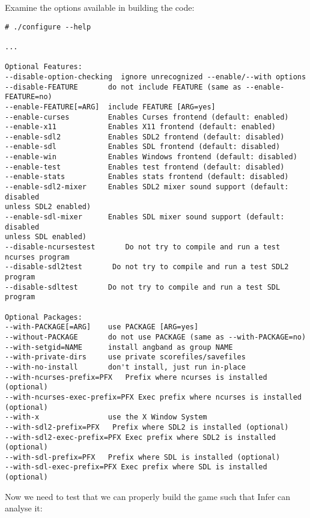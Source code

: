 \vspace{0.5cm}
Examine the options available in building the code:

\begin{verbatim}
# ./configure --help 

...

Optional Features:
--disable-option-checking  ignore unrecognized --enable/--with options
--disable-FEATURE       do not include FEATURE (same as --enable-FEATURE=no)
--enable-FEATURE[=ARG]  include FEATURE [ARG=yes]
--enable-curses         Enables Curses frontend (default: enabled)
--enable-x11            Enables X11 frontend (default: enabled)
--enable-sdl2           Enables SDL2 frontend (default: disabled)
--enable-sdl            Enables SDL frontend (default: disabled)
--enable-win            Enables Windows frontend (default: disabled)
--enable-test           Enables test frontend (default: disabled)
--enable-stats          Enables stats frontend (default: disabled)
--enable-sdl2-mixer     Enables SDL2 mixer sound support (default: disabled
unless SDL2 enabled)
--enable-sdl-mixer      Enables SDL mixer sound support (default: disabled
unless SDL enabled)
--disable-ncursestest       Do not try to compile and run a test ncurses program
--disable-sdl2test       Do not try to compile and run a test SDL2 program
--disable-sdltest       Do not try to compile and run a test SDL program

Optional Packages:
--with-PACKAGE[=ARG]    use PACKAGE [ARG=yes]
--without-PACKAGE       do not use PACKAGE (same as --with-PACKAGE=no)
--with-setgid=NAME      install angband as group NAME
--with-private-dirs     use private scorefiles/savefiles
--with-no-install       don't install, just run in-place
--with-ncurses-prefix=PFX   Prefix where ncurses is installed (optional)
--with-ncurses-exec-prefix=PFX Exec prefix where ncurses is installed (optional)
--with-x                use the X Window System
--with-sdl2-prefix=PFX   Prefix where SDL2 is installed (optional)
--with-sdl2-exec-prefix=PFX Exec prefix where SDL2 is installed (optional)
--with-sdl-prefix=PFX   Prefix where SDL is installed (optional)
--with-sdl-exec-prefix=PFX Exec prefix where SDL is installed (optional)

\end{verbatim}

\vspace{0.5cm}

Now we need to test that we can properly build the game such that Infer can analyse it:

